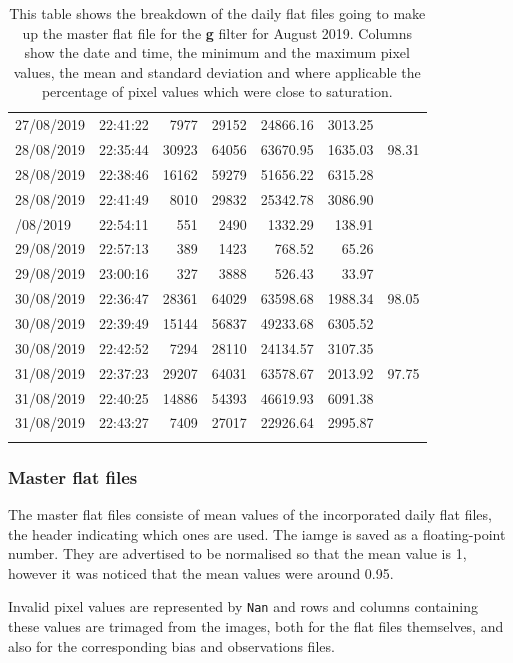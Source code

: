 \begin{longtable}{llrrrrr}
27/08/2019 & 22:41:22 & 7977 & 29152 & 24866.16 & 3013.25 &  \\
28/08/2019 & 22:35:44 & 30923 & 64056 & 63670.95 & 1635.03 & 98.31 \\
28/08/2019 & 22:38:46 & 16162 & 59279 & 51656.22 & 6315.28 &  \\
28/08/2019 & 22:41:49 & 8010 & 29832 & 25342.78 & 3086.90 &  \\
\pagebreak[4]
29/08/2019 & 22:54:11 & 551 & 2490 & 1332.29 & 138.91 &  \\
29/08/2019 & 22:57:13 & 389 & 1423 & 768.52 & 65.26 &  \\
29/08/2019 & 23:00:16 & 327 & 3888 & 526.43 & 33.97 &  \\
30/08/2019 & 22:36:47 & 28361 & 64029 & 63598.68 & 1988.34 & 98.05 \\
30/08/2019 & 22:39:49 & 15144 & 56837 & 49233.68 & 6305.52 &  \\
30/08/2019 & 22:42:52 & 7294 & 28110 & 24134.57 & 3107.35 &  \\
31/08/2019 & 22:37:23 & 29207 & 64031 & 63578.67 & 2013.92 & 97.75 \\
31/08/2019 & 22:40:25 & 14886 & 54393 & 46619.93 & 6091.38 &  \\
31/08/2019 & 22:43:27 & 7409 & 27017 & 22926.64 & 2995.87 &  \\
\hline
\captionsetup{skip=20pt}
\caption{
This table shows the breakdown of the daily flat files going to
make up the master flat file for the \textbf{g} filter for August
2019. Columns show the date and time, the minimum and the maximum pixel values,
the mean and standard deviation and where applicable the percentage of pixel
values which were close to saturation.}
\protect\label{table:flatdist}
\end{longtable}

\subsubsection{Master flat files}
\protect\label{section:masterflatfiles}

The master flat files consiste of mean values of the incorporated daily flat
files, the header indicating which ones are used. The iamge is saved as a
floating-point number. They are advertised to be normalised so that the mean
value is 1, however it was noticed that the mean values were around 0.95.

Invalid pixel values are represented by \texttt{Nan} and rows and columns
containing these values are trimaged from the images, both for the flat files
themselves, and also for the corresponding bias and observations files.

